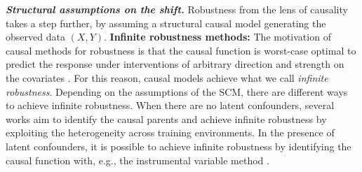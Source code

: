 \textbf{\textit{Structural assumptions on the shift.}}
Robustness from the lens of causality takes a step further, by assuming a structural causal model \cite{pearl2009causality} generating the observed data $(X, Y)$. 
\textbf{Infinite robustness methods:} 
The motivation of causal methods for robustness is that the causal function is worst-case optimal to predict the response under interventions of arbitrary direction and strength on the covariates \citep{meinshausen2018causality, buhlmann2020invariance}. For this reason, causal models achieve what we call \emph{infinite robustness}.
Depending on the assumptions of the SCM, there are different ways to achieve infinite robustness.
When there are no latent confounders, several works \citep{peters2016causal, fan2023environment, magliacane2018domain, rojas2018invariant, ahuja2020invariant, arjovsky2020invariant, shi2021gradient, xie2020risk, krueger2021out, ahuja2021invariance}  aim to identify the causal parents and achieve infinite robustness by exploiting the heterogeneity across training environments.
In the presence of latent confounders, it is possible to achieve infinite robustness by identifying the causal function with, e.g., the instrumental variable method \cite{angrist1996identification, hartford2017deep, singh2019kernel, bennett2019deep, muandet2020dual}.
